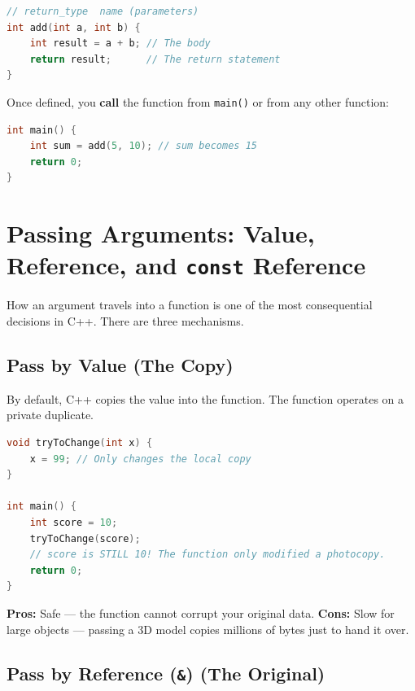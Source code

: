 \begin{lstlisting}[language=C++, caption={The four parts of a function definition}]
// return_type  name (parameters)
int add(int a, int b) {
    int result = a + b; // The body
    return result;      // The return statement
}
\end{lstlisting}

Once defined, you \textbf{call} the function from \texttt{main()} or from any other function:

\begin{lstlisting}[language=C++, caption={Calling a function}]
int main() {
    int sum = add(5, 10); // sum becomes 15
    return 0;
}
\end{lstlisting}

\section{Passing Arguments: Value, Reference, and \texttt{const} Reference}
\label{sec:argument-passing}

How an argument travels into a function is one of the most consequential decisions in C++. There are three mechanisms.

\subsection{Pass by Value (The Copy)}

By default, C++ copies the value into the function. The function operates on a private duplicate.

\begin{lstlisting}[language=C++, caption={Pass by value modifies only a copy}]
void tryToChange(int x) {
    x = 99; // Only changes the local copy
}

int main() {
    int score = 10;
    tryToChange(score);
    // score is STILL 10! The function only modified a photocopy.
    return 0;
}
\end{lstlisting}

\textbf{Pros:} Safe --- the function cannot corrupt your original data. \textbf{Cons:} Slow for large objects --- passing a 3D model copies millions of bytes just to hand it over.

\subsection{Pass by Reference (\texttt{\&}) (The Original)}

